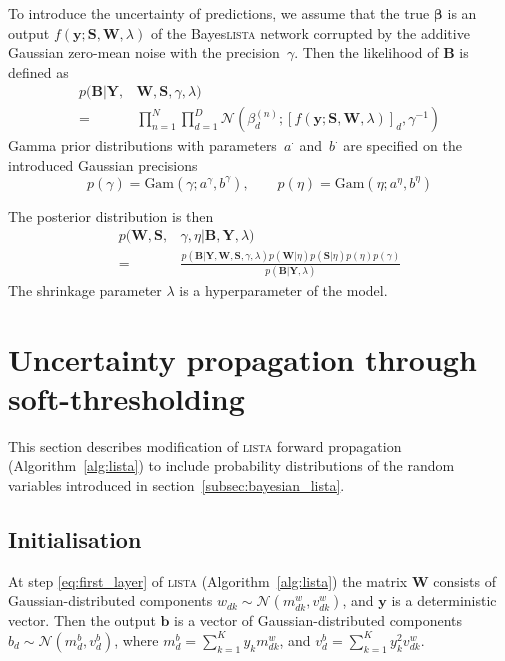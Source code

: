 \documentclass{article}
\begin{document}
  To introduce the uncertainty of predictions, we assume that the true $\boldsymbol\beta$ is an output $f(\mathbf{y} ; \mathbf{S}, \mathbf{W}, \lambda)$ of the Bayes\textsc{lista} network corrupted by the additive Gaussian zero-mean noise with the precision~$\gamma$. Then the likelihood of $\mathbf{B}$ is defined as
  \begin{equation}
  \label{eq:likelihood}
  \begin{split}
  p(\mathbf{B}| \mathbf{Y}, &\mathbf{W}, \mathbf{S}, \gamma, \lambda) \\
  = &\prod_{n=1}^N\prod_{d=1}^D\mathcal{N}\left(\beta_d^{(n)}; [f(\mathbf{y} ; \mathbf{S}, \mathbf{W}, \lambda)]_d, \gamma^{-1}\right)
 \end{split}
  \end{equation}
  Gamma prior distributions with parameters~$a^{\cdot}$ and~$b^{\cdot}$ are specified on the introduced Gaussian precisions
  \begin{equation}
  \label{eq:gamma_eta}
  p(\gamma) = \text{Gam}\left(\gamma; a^{\gamma}, b^{\gamma}\right), \qquad
  p(\eta) = \text{Gam}\left(\eta; 	a^{\eta}, b^{\eta}\right)
  \end{equation}

  The posterior distribution is then
  \begin{equation}
  \label{eq:posterior}
  \begin{split}
  p(\mathbf{W}, \mathbf{S}, &\gamma, \eta | \mathbf{B}, \mathbf{Y}, \lambda) \\
  = &\frac{p(\mathbf{B} | \mathbf{Y}, \mathbf{W},  \mathbf{S}, \gamma, \lambda) p(\mathbf{W} | \eta )p(\mathbf{S} | \eta) p(\eta) p(\gamma)}{p(\mathbf{B} | \mathbf{Y}, \lambda)}
  \end{split}
  \end{equation}
  The shrinkage parameter $\lambda$ is a hyperparameter of the model.

  \section{Uncertainty propagation through soft-thresholding}
  \label{sec:fprop}
  This section describes modification of \textsc{lista} forward propagation (Algorithm~\ref{alg:lista}) to include probability distributions of the random variables introduced in section~\ref{subsec:bayesian_lista}.

  \subsection{Initialisation}
  \label{subsec:forward_init}
  At step \ref{eq:first_layer} of \textsc{lista} (Algorithm~\ref{alg:lista}) the matrix $\mathbf{W}$ consists of Gaussian-distributed components $w_{dk} \sim \mathcal{N}(m^w_{dk}, v^w_{dk})$, and $\mathbf{y}$ is a deterministic vector. Then the output $\mathbf{b}$ is a vector of Gaussian-distributed components $b_d \sim \mathcal{N}(m^b_d, v^b_d)$, where $m^b_d = \sum_{k=1}^Ky_k m^w_{dk}$, and $v^b_d = \sum_{k=1}^Ky_k^2v^w_{dk}$.
\end{document}
